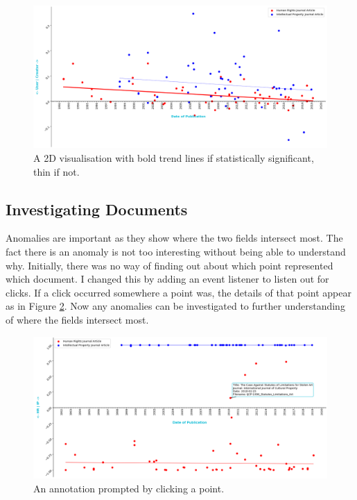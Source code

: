 			\begin{figure}
    			\centering
    			\includegraphics[width=0.9\linewidth]{resources/images/trend_bold.png}
    			\caption{A 2D visualisation with bold trend lines if statistically significant, thin if not.}
    			\label{fig:trend-bold}
			\end{figure}
			
		\subsection{Investigating Documents}
			Anomalies are important as they show where the two fields intersect most. The fact there is an anomaly is not too interesting without being able to understand why. Initially, there was no way of finding out about which point represented which document. I changed this by adding an event listener to listen out for clicks. If a click occurred somewhere a point was, the details of that point appear as in Figure \ref{fig:anomaly}. Now any anomalies can be investigated to further understanding of where the fields intersect most.
			\begin{figure}
    			\centering
    			\includegraphics[width=0.9\linewidth]{resources/images/anomaly.png}
    			\caption{An annotation prompted by clicking a point.}
    			\label{fig:anomaly}
			\end{figure}
			
